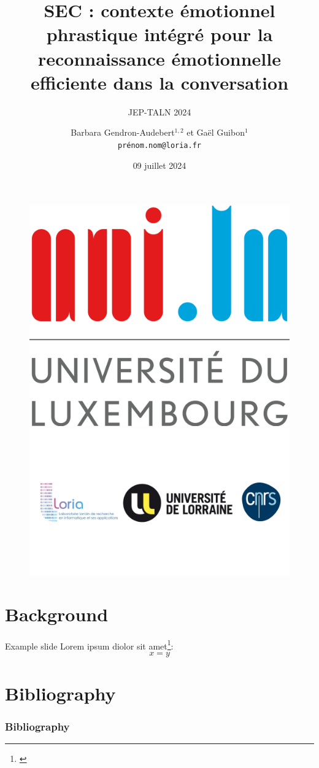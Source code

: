 \documentclass[11pt,aspectratio=169]{beamer}
\author[Gendron \& Guibon]{\large Barbara Gendron-Audebert$^{1,2}$ et Gaël Guibon$^1$ \\ \texttt{prénom.nom@loria.fr}}
\title[\textsl{SentEmoContext} (SEC) : ERC en contexte]{SEC : contexte émotionnel phrastique intégré pour la reconnaissance émotionnelle efficiente dans la conversation}
\subtitle{JEP-TALN 2024}
\date{09 juillet 2024}
\institute[UniLu. \& LORIA]{\small(1) LORIA, Université de Lorraine, CNRS \enspace (2) Université du Luxembourg}
\begin{document}
\begin{frame}[plain]

	\begin{figure} 
	\hspace*{0.5cm}
	\begin{minipage}[c]{.42\linewidth} 
	\includegraphics[scale=0.04]{unilu.png} 
	\end{minipage} \hfill 
	\begin{minipage}[c]{.53\linewidth} 
	\includegraphics[scale=0.25]{labo-logos.pdf} 
	\end{minipage} 
	\end{figure}
	\vspace*{10pt}
	\titlepage
	
\end{frame}

\section{Background}

\begin{frame}{Example slide}
Lorem ipsum diolor sit amet\footnote{\cite{khalizov2009enhanced}}:
$$
    x=y
$$
\end{frame}

\section{Bibliography}

\begin{frame}[t,allowframebreaks]
\frametitle{Bibliography}
\printbibliography
\end{frame}
\end{document}
